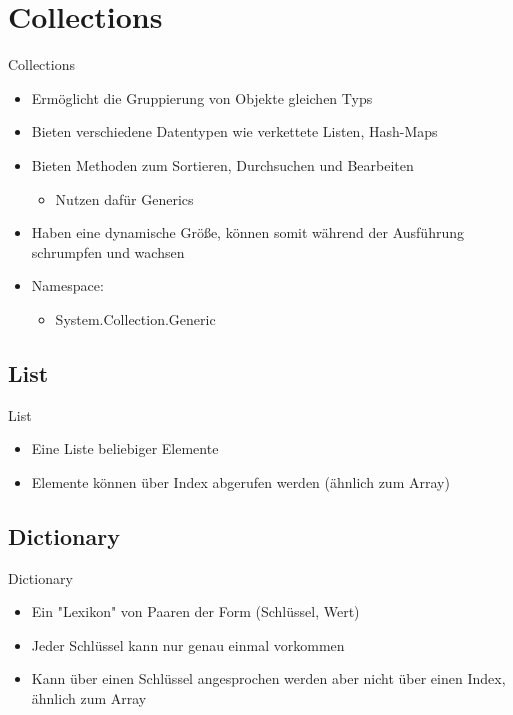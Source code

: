 \section{Collections}
\begin{frame}{Collections}
	\begin{itemize}
		\item Ermöglicht die Gruppierung von Objekte gleichen Typs
		\item Bieten verschiedene Datentypen wie verkettete Listen, Hash-Maps
		\item Bieten Methoden zum Sortieren, Durchsuchen und Bearbeiten
		\begin{itemize}
			\item Nutzen dafür Generics
		\end{itemize}
		\item Haben eine dynamische Größe, können somit während der Ausführung schrumpfen und wachsen
		\item Namespace:
		\begin{itemize}			
			\item \alert{System.Collection.Generic}
		\end{itemize}
	\end{itemize}
\end{frame}

\subsection{List}
\begin{frame}{List}
	\begin{itemize}
		\item Eine Liste beliebiger Elemente
		\item Elemente können über Index abgerufen werden (ähnlich zum Array)
	\end{itemize}
	
\end{frame}

\subsection{Dictionary}
\begin{frame}{Dictionary}
	\begin{itemize}
		\item Ein "Lexikon" von Paaren der Form (Schlüssel, Wert)
		\item Jeder Schlüssel kann nur genau einmal vorkommen
		\item Kann über einen Schlüssel angesprochen werden aber nicht über einen Index, ähnlich zum Array
	\end{itemize}
	
\end{frame}

